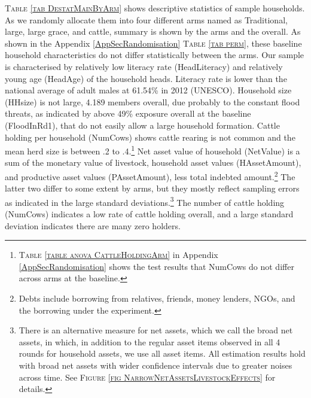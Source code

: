 	\textsc{\small Table \ref{tab DestatMainByArm}} shows descriptive statistics of sample households. As we randomly allocate them into four different arms named as \textsf{Traditional}, \textsf{large}, \textsf{large grace}, and \textsf{cattle}, summary is shown by the arms and the overall. As shown in the Appendix \ref{AppSecRandomisation} \textsc{\normalsize Table \ref{tab perm}}, these baseline household characteristics do not differ statistically between the arms. Our sample is characterised by relatively low literacy rate (\textsf{HeadLiteracy}) and relatively young age (\textsf{HeadAge}) of the household heads. Literacy rate is lower than the national average of adult males at 61.54\% in 2012 (UNESCO). Household size (\textsf{HHsize}) is not large, 4.189 members overall, due probably to the constant flood threats, as indicated by above 49\% exposure overall at the baseline (\textsf{FloodInRd1}), that do not easily allow a large household formation. Cattle holding per household (\textsf{NumCows}) shows cattle rearing is not common and the mean herd size is between .2 to .4.\footnote{ \textsc{Table \ref{table anova CattleHoldingArm}} in Appendix \ref{AppSecRandomisation} shows the test results that \textsf{NumCows} do not differ across arms at the baseline. } Net asset value of household (\textsf{NetValue}) is a sum of the monetary value of livestock, household asset values (\textsf{HAssetAmount}), and productive asset values (\textsf{PAssetAmount}), less total indebted amount.\footnote{Debts include borrowing from relatives, friends, money lenders, NGOs, and the borrowing under the experiment. } The latter two differ to some extent by arms, but they mostly reflect sampling errors as indicated in the large standard deviations.\footnote{There is an alternative measure for net assets, which we call the broad net assets, in which, in addition to the regular asset items observed in all 4 rounds for household assets, we use all asset items. All estimation results hold with broad net assets with wider confidence intervals due to greater noises across time. See \textsc{\footnotesize Figure \ref{fig NarrowNetAssetsLivestockEffects}} for details. } The number of cattle holding (\textsf{NumCows}) indicates a low rate of cattle holding overall, and a large standard deviation indicates there are many zero holders. 

